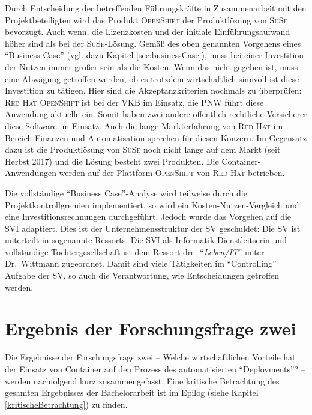 Durch Entscheidung der betreffenden Führungskräfte in Zusammenarbeit mit den Projektbeteiligten wird das Produkt \textsc{OpenShift} der Produktlösung von \textsc{SuSe} bevorzugt. Auch wenn, die Lizenzkosten und der initiale Einführungsaufwand höher sind als bei der \textsc{SuSe}-Lösung. Gemäß des oben genannten Vorgehens eines \enquote{Business Case} (vgl. dazu Kapitel \vref{sec:businessCase}), muss bei einer Investition der Nutzen immer größer sein als die Kosten. Wenn das nicht gegeben ist, muss eine Abwägung getroffen werden, ob es trotzdem wirtschaftlich sinnvoll ist diese Investition zu tätigen. Hier sind die Akzeptanzkriterien nochmals zu überprüfen: \textsc{Red Hat} \textsc{OpenShift} ist bei der \ac{VKB} im Einsatz, die \ac{PNW} führt diese Anwendung aktuelle ein. Somit haben zwei andere öffentlich-rechtliche Versicherer diese Software im Einsatz. Auch die lange Markterfahrung von \textsc{Red Hat} im Bereich Finanzen und Automatisation sprechen für diesen Konzern. Im Gegensatz dazu ist die Produktlösung von \textsc{SuSe} noch nicht lange auf dem Markt (seit Herbst 2017) und die Lösung besteht zwei Produkten. Die Container-Anwendungen werden auf der Plattform \textsc{OpenShift} von \textsc{Red Hat} betrieben.
\par
Die vollständige \enquote{Business Case}-Analyse wird teilweise durch die Projektkontrollgremien implementiert, so wird ein Kosten-Nutzen-Vergleich und eine Investitionsrechnungen durchgeführt. Jedoch wurde das Vorgehen auf die \ac{SVI} adaptiert. Dies ist der Unternehmensstruktur der \ac{SV} geschuldet: Die \ac{SV} ist unterteilt in sogenannte Ressorts. Die \ac{SVI} als Informatik-Dienstleitserin und vollständige Tochtergesellschaft ist dem Ressort drei \enquote{\textit{Leben/IT}} unter Dr.~Wittmann zugeordnet. Damit sind viele Tätigkeiten im \enquote{Controlling} Aufgabe der \ac{SV}, so auch die Verantwortung, wie Entscheidungen getroffen werden. 

\section{Ergebnis der Forschungsfrage zwei}
Die Ergebnisse der Forschungsfrage zwei -- Welche wirtschaftlichen Vorteile hat der Einsatz von Container auf den Prozess des automatisierten \enquote{Deployments}? -- werden nachfolgend kurz zusammengefasst. Eine kritische Betrachtung des gesamten Ergebnisses der Bachelorarbeit ist im Epilog (siehe Kapitel \vref{kritischeBetrachtung}) zu finden.

